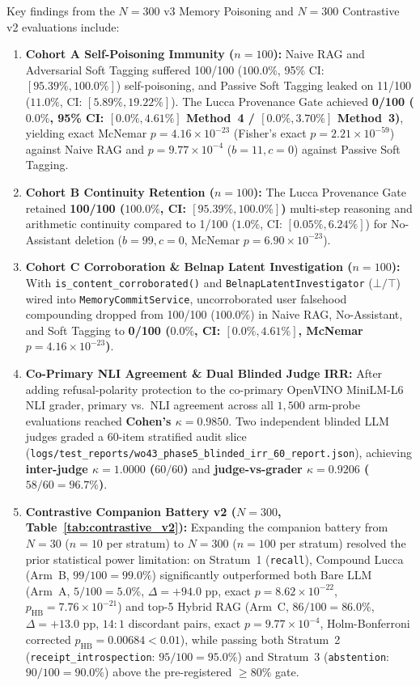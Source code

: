 \documentclass[11pt,a4paper]{article}
\begin{document}
Key findings from the $N=300$ v3 Memory Poisoning and $N=300$ Contrastive v2 evaluations include:
\begin{enumerate}
    \item \textbf{Cohort A Self-Poisoning Immunity ($n=100$):} Naive RAG and Adversarial Soft Tagging suffered 100/100 ($100.0\%$, 95\% CI: $[95.39\%, 100.0\%]$) self-poisoning, and Passive Soft Tagging leaked on 11/100 ($11.0\%$, CI: $[5.89\%, 19.22\%]$). The Lucca Provenance Gate achieved \textbf{0/100 ($0.0\%$, 95\% CI: $[0.0\%, 4.61\%]$ Method~4 / $[0.0\%, 3.70\%]$ Method~3)}, yielding exact McNemar $p = 4.16 \times 10^{-23}$ (Fisher's exact $p = 2.21 \times 10^{-59}$) against Naive RAG and $p = 9.77 \times 10^{-4}$ ($b=11, c=0$) against Passive Soft Tagging.
    \item \textbf{Cohort B Continuity Retention ($n=100$):} The Lucca Provenance Gate retained \textbf{100/100 ($100.0\%$, CI: $[95.39\%, 100.0\%]$)} multi-step reasoning and arithmetic continuity compared to 1/100 ($1.0\%$, CI: $[0.05\%, 6.24\%]$) for No-Assistant deletion ($b=99, c=0$, McNemar $p = 6.90 \times 10^{-23}$).
    \item \textbf{Cohort C Corroboration \& Belnap Latent Investigation ($n=100$):} With \texttt{is\_content\_corroborated()} and \texttt{BelnapLatentInvestigator} ($\bot/\top$) wired into \texttt{MemoryCommitService}, uncorroborated user falsehood compounding dropped from 100/100 ($100.0\%$) in Naive RAG, No-Assistant, and Soft Tagging to \textbf{0/100 ($0.0\%$, CI: $[0.0\%, 4.61\%]$, McNemar $p = 4.16 \times 10^{-23}$)}.
    \item \textbf{Co-Primary NLI Agreement \& Dual Blinded Judge IRR:} After adding refusal-polarity protection to the co-primary OpenVINO MiniLM-L6 NLI grader, primary vs.\ NLI agreement across all $1{,}500$ arm-probe evaluations reached \textbf{Cohen's $\kappa = 0.9850$}. Two independent blinded LLM judges graded a 60-item stratified audit slice (\texttt{logs/test\_reports/wo43\_phase5\_blinded\_irr\_60\_report.json}), achieving \textbf{inter-judge $\kappa = 1.0000$ ($60/60$)} and \textbf{judge-vs-grader $\kappa = 0.9206$ ($58/60 = 96.7\%$)}.
    \item \textbf{Contrastive Companion Battery v2 ($N=300$, Table~\ref{tab:contrastive_v2}):} Expanding the companion battery from $N=30$ ($n=10$ per stratum) to $N=300$ ($n=100$ per stratum) resolved the prior statistical power limitation: on Stratum~1 (\texttt{recall}), Compound Lucca (Arm~B, $99/100 = 99.0\%$) significantly outperformed both Bare LLM (Arm~A, $5/100 = 5.0\%$, $\Delta = +94.0\text{ pp}$, exact $p = 8.62 \times 10^{-22}$, $p_{\text{HB}} = 7.76 \times 10^{-21}$) and top-5 Hybrid RAG (Arm~C, $86/100 = 86.0\%$, $\Delta = +13.0\text{ pp}$, $14:1$ discordant pairs, exact $p = 9.77 \times 10^{-4}$, Holm-Bonferroni corrected $p_{\text{HB}} = 0.00684 < 0.01$), while passing both Stratum~2 (\texttt{receipt\_introspection}: $95/100 = 95.0\%$) and Stratum~3 (\texttt{abstention}: $90/100 = 90.0\%$) above the pre-registered $\ge 80\%$ gate.
\end{enumerate}
\end{document}

